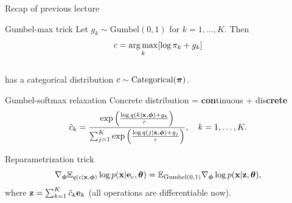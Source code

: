 


\begin{frame}
\titlepage
\end{frame}
\begin{frame}{Recap of previous lecture}
	\vspace{-0.4cm}
	\begin{block}{Gumbel-max trick}
		Let $g_k \sim \text{Gumbel}(0, 1)$ for $k = 1, \dots, K$. Then
		\vspace{-0.3cm}
		\[
			c = \operatorname*{arg\,max}_k [\log \pi_k + g_k]
		\]
		\vspace{-0.6cm} \\
		has a categorical distribution $c \sim \text{Categorical}(\boldsymbol{\pi})$.
	\end{block}
	\vspace{-0.2cm}
	\begin{block}{Gumbel-softmax relaxation}
		{\color{violet}Con}{\color{teal}crete} distribution = {\color{violet}\textbf{con}tinuous} + {\color{teal}dis\textbf{crete}}
		\vspace{-0.2cm}
		\[
			\hat{c}_k = \frac{\exp \left(\frac{\log q(k | \mathbf{x}, \boldsymbol{\phi}) + g_k}{\tau}\right)}{\sum_{j=1}^K \exp \left(\frac{\log q(j | \mathbf{x}, \boldsymbol{\phi}) + g_j}{\tau}\right)}, \quad k = 1, \dots, K.
		\]
		\vspace{-0.7cm}
 	\end{block}
	\begin{block}{Reparametrization trick}
		\vspace{-0.4cm}
		\[
			\nabla_{\boldsymbol{\phi}} \mathbb{E}_{q(c | \mathbf{x}, \boldsymbol{\phi})} \log p(\mathbf{x} | \mathbf{e}_{c} , \boldsymbol{\theta}) = \mathbb{E}_{\text{Gumbel}(0, 1)} \nabla_{\boldsymbol{\phi}} \log p(\mathbf{x} | \mathbf{z} , \boldsymbol{\theta}),
		\]
		where $\mathbf{z} = \sum_{k=1}^K\hat{c}_k \mathbf{e}_k$ (all operations are differentiable now).
	\end{block}
 	\vspace{-0.2cm}
\end{frame}
